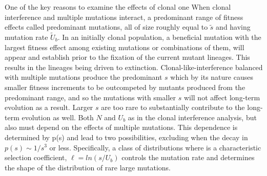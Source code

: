 \documentclass[12pt, one column]{article}
\begin{document}
One of the key reasons to examine the effects of clonal one When clonal interference and multiple mutations interact, a predominant range of fitness effects called predominant mutations, all of size roughly equal to $\tilde{s}$ and having mutation rate $\tilde{U}_b$.  In an initially clonal population, a beneficial mutation with the largest fitness effect among existing mutations or combinations of them, will appear and establish prior to the fixation of the current mutant lineages.  This results in the lineages being driven to extinction.  Clonal-like-interference balanced with multiple mutations produce the predominant $s$ which by its nature causes smaller fitness increments to be outcompeted by mutants produced from the predominant range, and so the mutations with smaller $s$ will not affect long-term evolution as a result.  Larger $s$ are too rare to substantially contribute to the long-term evolution as well.  Both $N$ and $U_b$ as in the clonal interference analysis, but also must depend on the effects of multiple mutations.  This dependence is determined by p(s) and lead to two possibilities, excluding when the decay in $p(s) \sim 1/s^3$  or less.  Specifically, a class of distributions where is a characteristic selection coefficient, $\ell=ln(s/U_b)$ controls the mutation rate and determines the shape of the distribution of rare large mutations. 
\end{document}
